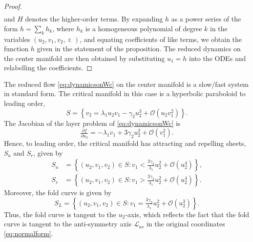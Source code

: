 \documentclass[10pt,onecolumn]{article}
\theoremstyle{plain}
\DeclareMathOperator{\eps}{\varepsilon}
\begin{document}
\begin{proof}
\begin{equation*}
\begin{split}
  \end{split}
\end{equation*}
%
and $H$ denotes the higher-order terms.
By expanding $h$ as a power series of the form $\displaystyle h = \sum_k h_k$, where $h_k$ is a homogeneous polynomial of degree $k$ in the variables $(u_2,v_1,v_2,\eps)$, and equating coefficients of like terms, we obtain the function $h$ given in the statement of the proposition. 
%
%
The reduced dynamics on the center manifold are then obtained by substituting $u_1 = h$ into the ODEs and relabelling the coefficients.
\end{proof}

The reduced flow \eqref{eq:dynamicsonWc} on the center manifold is a slow/fast system in standard form. The critical manifold in this case is a hyperbolic paraboloid to leading order,
%
\[ S = \left\{ v_2 = \lambda_1 u_2 v_1 - \gamma_2 u_2^3 + \mathcal{O} \left( u_2 v_1^2 \right) \right\}. \]
%
The Jacobian of the layer problem of \eqref{eq:dynamicsonWc} is 
%
\[ \tfrac{\partial f}{\partial u_2} = -\lambda_1 v_1  + 3\gamma_2 u_2^2 + \mathcal O(v_1^2). \]
%
Hence, to leading order, the critical manifold has attracting and repelling sheets, $S_a$ and $S_r$, given by 
%
\begin{equation*}
  \begin{split}
    S_a &= \left\{ (u_2,v_1,v_2) \in S : v_1 < \tfrac{3\gamma_2}{\lambda_1} u_2^2 + \mathcal O(u_2^4) \right\}, \\ 
    S_r &= \left\{ (u_2,v_1,v_2) \in S : v_1 > \tfrac{3\gamma_2}{\lambda_1} u_2^2 + \mathcal O(u_2^4) \right\}.
  \end{split}
\end{equation*}
%
Moreover, the fold curve is given by 
%
\[ S_L = \left\{ (u_2,v_1,v_2) \in S : v_1 = \tfrac{3\gamma_2}{\lambda_1} u_2^2 + \mathcal O(u_2^3) \right\}. \]
%
Thus, the fold curve is tangent to the $u_2$-axis, which reflects the fact that the fold curve is tangent to the anti-symmetry axis $\mathcal L_{as}$ in the original coordinates \eqref{eq:normalform}.
\end{document}
